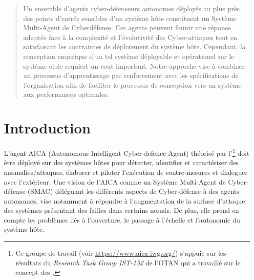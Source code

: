 \documentclass[conference]{IEEEtran}
\begin{document}
\maketitle

\begin{abstract}

    Un ensemble d'agents cyber-défenseurs autonomes déployés au plus près des points d'entrée sensibles d'un système hôte constituent un Système Multi-Agent de Cyberdéfense. Ces agents peuvent founir une réponse adaptée face à la complexité et l'évolutivité des Cyber-attaques tout en satisfaisant les contraintes de déploiement du système hôte.
    Cependant, la conception empirique d'un tel système déployable et opérationel sur le système cible requiert un cout important.
    Notre approche vise à combiner un processus d'apprentissage par renforcement avec les spécifications de l'organisation afin de faciliter le processus de conception vers un système aux performances optimales.

\end{abstract}


\section{Introduction}


L'agent AICA (Autonomous Intelligent Cyber-defence Agent) théorisé par l'\footnote{Ce groupe de travail (voir \url{https://www.aica-iwg.org/}) s'appuie sur les résultats du \textit{Research Task Group IST-152} de l'OTAN qui a travaillé sur le concept des .} doit être déployé sur des systèmes hôtes pour détecter, identifier et caractériser des anomalies/attaques, élaborer et piloter l’exécution de contre-mesures et dialoguer avec l'extérieur.
Une vision de l'AICA comme un Système Multi-Agent de Cyber-défense (SMAC) déléguant les différents aspects de Cyber-défense à des agents autonomes, vise notamment à répondre à l'augmentation de la surface d'attaque des systèmes  présentant des failles dans certains nœuds\cite{kott2018autonomous}. De plus, elle prend en compte les problèmes liés à l'ouverture, le passage à l'échelle et l'autonomie du système hôte.
\end{document}
